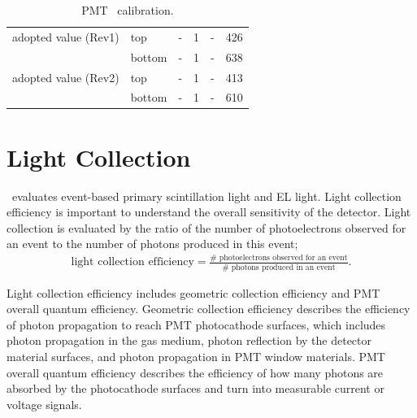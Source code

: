 \begin{table}[!h]
\begin{tabular}[!h]{ | m{10em} ||m{5em} |m{5em} | m{5em} | m{5em}| m{5em}|}
		\hline
adopted value (Rev1)& top & - & 1  & - & \num{426}   \\\cline{2-6}& bottom & - & 1  & - & \num{638}\\\hline %
adopted value (Rev2)& top & - & 1  & - & \num{413}   \\\cline{2-6}& bottom & - & 1  & - & \num{610}\\\hline %

	\end{tabular}
	
	\caption[PMT calibration.]{PMT \sphe\ calibration. 
	}
 \label{tab:PMTparameters}
	\end{table}

\section{Light Collection}
\label{sec:gtest light collection}
\gtest\ evaluates event-based primary scintillation light and EL light. Light collection efficiency is important to understand the overall sensitivity of the detector.  Light collection is evaluated by the ratio of the number of photoelectrons observed for an event to the number of photons produced in this event;
\begin{align}
\text{light collection efficiency} = \frac{\text{\#\  photoelectrons observed for an event}}{\text{\#\  photons produced in an event}}.
\end{align}

Light collection efficiency includes geometric collection efficiency and PMT overall quantum efficiency. Geometric collection efficiency describes the efficiency of photon propagation to reach PMT photocathode surfaces, which includes photon propagation in the gas medium, photon reflection by the detector material surfaces, and photon propagation in PMT window materials. PMT overall quantum efficiency describes the efficiency of how many photons are absorbed by the photocathode surfaces and turn into measurable current or voltage signals.


